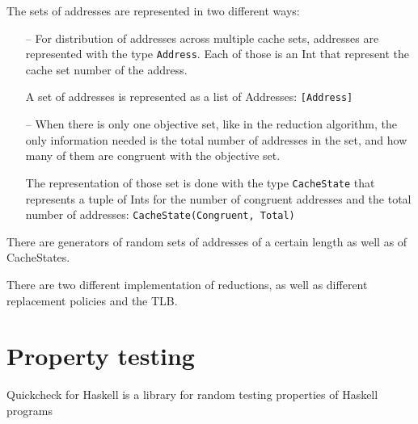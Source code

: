 \documentclass[11pt]{article}
\begin{document}
The sets of addresses are represented in two different ways:

\begin{itemize}
\item[--] For distribution of addresses across multiple cache sets, addresses are represented with the type \texttt{Address}. Each of those is an Int that represent the cache set number of the address.

A set of addresses is represented as a list of Addresses: \texttt{[Address]}

\item[--] When there is only one objective set, like in the reduction algorithm, the only information needed is the total number of addresses in the set, and how many of them are congruent with the objective set.

  The representation of those set is done with the type \texttt{CacheState} that represents a tuple of Ints for the number of congruent addresses and the total number of addresses: \texttt{CacheState(Congruent, Total)}
\end{itemize}

There are generators of random sets of addresses of a certain length as well as of CacheStates.

There are two different implementation of reductions, as well as different replacement policies and the TLB.
\clearpage

\section{Property testing}
Quickcheck for Haskell is a library for random testing properties of Haskell programs \cite{claessen2011quickcheck, qc1, qc2, qc3}
\end{document}
